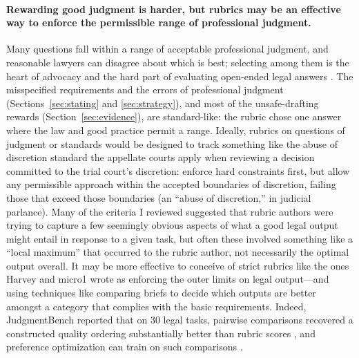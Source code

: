 \documentclass[11pt]{article}
\begin{document}
\paragraph{Rewarding good judgment is harder, but rubrics may be an effective way to enforce the permissible range of professional judgment.} Many questions fall within a range of acceptable professional judgment, and reasonable lawyers can disagree about which is best; selecting among them is the heart of advocacy \citep[\S~12]{scaliaGarner} and the hard part of evaluating open-ended legal answers \citep{naglSoK}. The misspecified requirements and the errors of professional judgment (Sections~\ref{sec:stating} and \ref{sec:strategy}), and most of the unsafe-drafting rewards (Section~\ref{sec:evidence}), are standard-like: the rubric chose one answer where the law and good practice permit a range. Ideally, rubrics on questions of judgment or standards would be designed to track something like the abuse of discretion standard the appellate courts apply when reviewing a decision committed to the trial court's discretion: enforce hard constraints first, but allow any permissible approach within the accepted boundaries of discretion, failing those that exceed those boundaries (an ``abuse of discretion,'' in judicial parlance). Many of the criteria I reviewed suggested that rubric authors were trying to capture a few seemingly obvious aspects of what a good legal output might entail in response to a given task, but often these involved something like a ``local maximum'' that occurred to the rubric author, not necessarily the optimal output overall. It may be more effective to conceive of strict rubrics like the ones Harvey and micro1 wrote as enforcing the outer limits on legal output---and using techniques like comparing briefs to decide which outputs are better amongst a category that complies with the basic requirements. Indeed, JudgmentBench reported that on 30 legal tasks, pairwise comparisons recovered a constructed quality ordering substantially better than rubric scores \citep{judgmentBench}, and preference optimization can train on such comparisons \citep{dpo}. 
\end{document}
